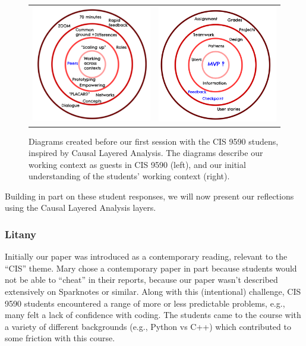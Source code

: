 \documentclass[acmlarge,timestamp]{acmart}
\begin{document}
\begin{figure}[h]
  \begin{tabular}{cc}
    \includegraphics[width=.45\textwidth]{UsCLA.png} &
    \includegraphics[width=.45\textwidth]{ThemCLA.png}
  \end{tabular}
\caption{Diagrams created before our first session with the CIS 9590 studens, inspired by Causal Layered Analysis.  The diagrams describe our working context as guests in CIS 9590 (left), and our initial understanding of the students’ working context (right).\label{cis-9590-anticipations}}
\end{figure}

Building in part on these student responses, we will now present our
reflections using the Causal Layered Analysis layers.

\subsubsection{Litany}
Initially our paper was introduced as a contemporary reading, relevant
to the “CIS” theme.  Mary chose a contemporary paper in part because
students would not be able to “cheat” in their reports, because our
paper wasn’t described extensively on Sparknotes or similar.  Along
with this (intentional) challenge, CIS 9590 students encountered a
range of more or less predictable problems, e.g., many felt a lack of
confidence with coding.  The students came to the course with a
variety of different backgrounds (e.g., Python vs C++) which
contributed to some friction with this course.
\end{document}

